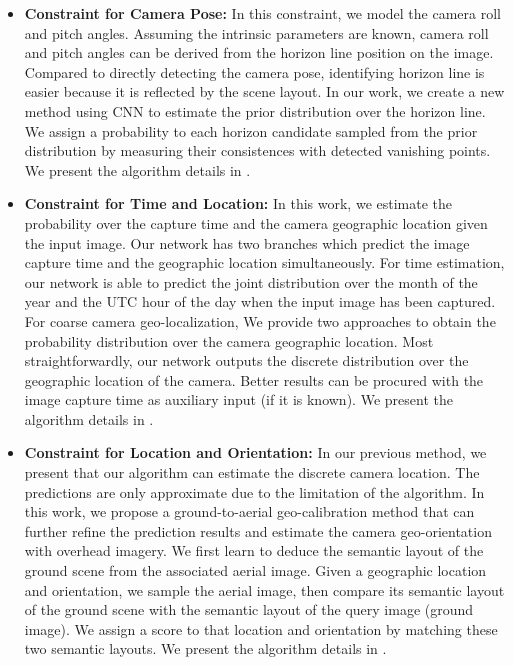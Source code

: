\begin{itemize}[noitemsep]
  \item \textbf{Constraint for Camera Pose:}
  In this constraint, we model the camera roll and pitch angles.
  Assuming the intrinsic parameters are known, camera roll and pitch
  angles can be derived from the horizon line position on the image.
  Compared to directly detecting the camera pose, identifying horizon
  line is easier because it is reflected by the scene layout.
  In our work, we create a new method using CNN to estimate the
  prior distribution over the horizon line. We assign a probability to
  each horizon candidate sampled from the prior distribution by
  measuring their consistences with detected vanishing points. We
  present the algorithm details in .  \newline

  \item \textbf{Constraint for Time and Location:}
  In this work, we estimate the probability over the
  capture time and the camera geographic location given the input image.
  Our network has two branches which predict the image
  capture time and the geographic location simultaneously.
  For time estimation, our network is able to predict the
  joint distribution over the month of the year and the UTC hour of the
  day when the input image has been captured.
  For coarse camera geo-localization, We provide two approaches to
  obtain the probability distribution over the camera geographic
  location. Most straightforwardly, our network outputs the discrete
  distribution over the geographic location of the camera. Better
  results can be procured with the image capture time as auxiliary input
  (if it is known).  We present the algorithm details in
  .
  \newline

  \item \textbf{Constraint for Location and Orientation:}
  In our previous method, we present that our algorithm can estimate
  the discrete camera location. The predictions are only approximate
  due to the limitation of the algorithm. In this
  work, we propose a ground-to-aerial geo-calibration method that can
  further refine the prediction results and estimate the
  camera geo-orientation with overhead imagery.
%
  We first learn to deduce the semantic layout of the ground
  scene from the associated aerial image.
  Given a geographic location and orientation, we sample the aerial
  image, then compare its semantic layout of the ground scene
  with the semantic layout of the query image (ground image).
  We assign a score to that location and orientation by matching these
  two semantic layouts.
  We present the algorithm details in .
  \newline

\end{itemize}


